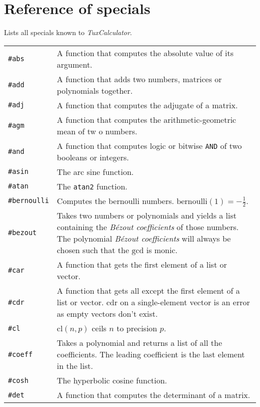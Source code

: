 \documentclass[10pt]{article}
\begin{document}
    \section{Reference of specials}\label{sec:reference-special}
    Lists all specials known to \textit{TuxCalculator}.
    \begin{longtable}{p{}p{}}
        \verb|#abs|       & A function that computes the absolute value of its argument. \\
        \verb|#add|       & A function that adds two numbers, matrices or polynomials together. \\
        \verb|#adj|       & A function that computes the adjugate of a matrix. \\
        \verb|#agm|       & A function that computes the arithmetic-geometric mean of tw o numbers. \\
        \verb|#and|       & A function that computes logic or bitwise \verb|AND| of two booleans or integers. \\
        \verb|#asin|      & The arc sine function. \\
        \verb|#atan|      & The \verb|atan2| function. \\
        \verb|#bernoulli| & Computes the bernoulli numbers. $ \mathrm{bernoulli}(1) = -\frac{1}{2} $. \\
        \verb|#bezout|    & Takes two numbers or polynomials and yields a list containing the \textsl{B\'ezout coefficients} of those numbers.
                            The polynomial \textsl{B\'ezout coefficients} will always be chosen such that the $ \mathrm{gcd} $ is monic. \\
        \verb|#car|       & A function that gets the first element of a list or vector. \\
        \verb|#cdr|       & A function that gets all except the first element of a list or vector.
                            $ \mathrm{cdr} $ on a single-element vector is an error as empty vectors don't exist. \\
        \verb|#cl|        & $ \mathrm{cl}(n,p) $ ceils $ n $ to precision $ p $. \\
        \verb|#coeff|     & Takes a polynomial and returns a list of all the coefficients.
                            The leading coefficient is the last element in the list. \\
        \verb|#cosh|      & The hyperbolic cosine function. \\
        \verb|#det|       & A function that computes the determinant of a matrix. \\

\end{longtable}
\end{document}
